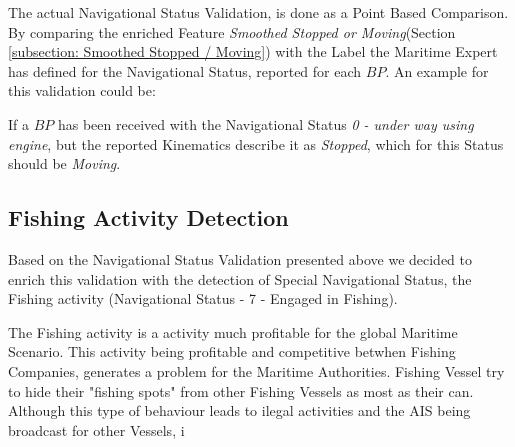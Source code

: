 The actual Navigational Status Validation, is done as a Point Based Comparison. By comparing the enriched Feature \textit{Smoothed Stopped or Moving}(Section \ref{subsection: Smoothed Stopped / Moving}) with the Label the Maritime Expert has defined for the Navigational Status, reported for each $BP$.
An example for this validation could be:

If a $BP$ has been received with the Navigational Status \textit{0 - under way using engine}, but the reported Kinematics describe it as \textit{Stopped}, which for this Status should be \textit{Moving}.

\subsection{Fishing Activity Detection}
\label{subsection: Fishing Activity Detection}

Based on the Navigational Status Validation presented above we decided to enrich this validation with the detection of Special Navigational Status, the Fishing activity (Navigational Status - 7 - Engaged in Fishing). 

The Fishing activity is a activity much profitable for the global Maritime Scenario. This activity being profitable and competitive betwhen Fishing Companies, generates a problem for the Maritime Authorities. Fishing Vessel try to hide their "fishing spots" from other Fishing Vessels as most as their can. Although this type of behaviour leads to ilegal activities   and the AIS being broadcast for other Vessels, i


